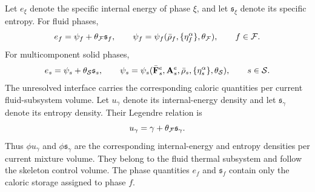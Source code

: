 Let \(e_\xi\) denote the specific internal energy of phase \(\xi\), and let
\(\mathfrak{s}_\xi\) denote its specific entropy.  For fluid phases,
%
\begin{equation}
	e_f=\psi_f+\theta_{\mathcal{F}}\mathfrak{s}_f,
	\qquad
	\psi_f=\psi_f(\bar\rho_f,\{\eta_f^\alpha\},\theta_{\mathcal{F}}),
	\qquad
	f\in\mathcal{F} .
	\label{eq:MC_fluid_legendre_relation}
\end{equation}
%
For multicomponent solid phases,
%
\begin{equation}
	e_s=\psi_s+\theta_{\mathcal{S}}\mathfrak{s}_s,
	\qquad
	\psi_s=\psi_s(
	\bar{\mathbf{F}}_s^e,\mathbf{A}_s^e,
	\bar\rho_s,\{\eta_s^\alpha\},\theta_{\mathcal{S}}),
	\qquad
	s\in\mathcal{S} .
	\label{eq:MC_solid_legendre_relation}
\end{equation}
%
The unresolved interface carries the corresponding caloric quantities per
current fluid-subsystem volume.  Let \(u_\gamma\) denote its internal-energy
density and let \(\mathfrak{s}_\gamma\) denote its entropy density.  Their
Legendre relation is
%
\begin{equation}
	u_\gamma
	=
	\gamma+\theta_{\mathcal{F}}\mathfrak{s}_\gamma .
	\label{eq:MC_interfacial_legendre_relation}
\end{equation}
%
Thus \(\phi u_\gamma\) and \(\phi\mathfrak{s}_\gamma\) are the corresponding
internal-energy and entropy densities per current mixture volume.  They belong
to the fluid thermal subsystem and follow the skeleton control volume.  The
phase quantities \(e_f\) and \(\mathfrak{s}_f\) contain only the caloric storage
assigned to phase \(f\).


